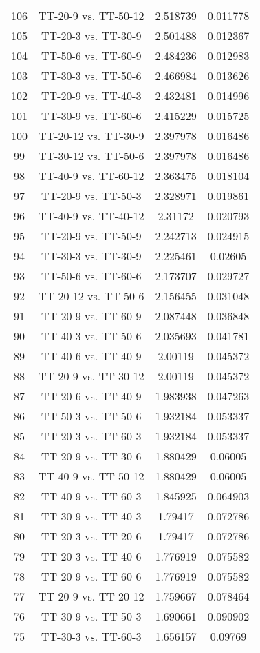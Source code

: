 \documentclass[a4paper,10pt]{article}
\begin{document}
\begin{landscape}
\begin{table}[!htp]
\begin{tabular}{cccc}
106&TT-20-9 vs. TT-50-12&2.518739&0.011778\\
105&TT-20-3 vs. TT-30-9&2.501488&0.012367\\
104&TT-50-6 vs. TT-60-9&2.484236&0.012983\\
103&TT-30-3 vs. TT-50-6&2.466984&0.013626\\
102&TT-20-9 vs. TT-40-3&2.432481&0.014996\\
101&TT-30-9 vs. TT-60-6&2.415229&0.015725\\
100&TT-20-12 vs. TT-30-9&2.397978&0.016486\\
99&TT-30-12 vs. TT-50-6&2.397978&0.016486\\
98&TT-40-9 vs. TT-60-12&2.363475&0.018104\\
97&TT-20-9 vs. TT-50-3&2.328971&0.019861\\
96&TT-40-9 vs. TT-40-12&2.31172&0.020793\\
95&TT-20-9 vs. TT-50-9&2.242713&0.024915\\
94&TT-30-3 vs. TT-30-9&2.225461&0.02605\\
93&TT-50-6 vs. TT-60-6&2.173707&0.029727\\
92&TT-20-12 vs. TT-50-6&2.156455&0.031048\\
91&TT-20-9 vs. TT-60-9&2.087448&0.036848\\
90&TT-40-3 vs. TT-50-6&2.035693&0.041781\\
89&TT-40-6 vs. TT-40-9&2.00119&0.045372\\
88&TT-20-9 vs. TT-30-12&2.00119&0.045372\\
87&TT-20-6 vs. TT-40-9&1.983938&0.047263\\
86&TT-50-3 vs. TT-50-6&1.932184&0.053337\\
85&TT-20-3 vs. TT-60-3&1.932184&0.053337\\
84&TT-20-9 vs. TT-30-6&1.880429&0.06005\\
83&TT-40-9 vs. TT-50-12&1.880429&0.06005\\
82&TT-40-9 vs. TT-60-3&1.845925&0.064903\\
81&TT-30-9 vs. TT-40-3&1.79417&0.072786\\
80&TT-20-3 vs. TT-20-6&1.79417&0.072786\\
79&TT-20-3 vs. TT-40-6&1.776919&0.075582\\
78&TT-20-9 vs. TT-60-6&1.776919&0.075582\\
77&TT-20-9 vs. TT-20-12&1.759667&0.078464\\
76&TT-30-9 vs. TT-50-3&1.690661&0.090902\\
75&TT-30-3 vs. TT-60-3&1.656157&0.09769\\

\end{tabular}
\end{table}
\end{landscape}
\end{document}
